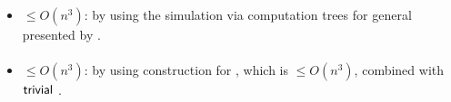 \paragraph{\OMODLA{}\tto\TDFA}\label{cost:OM1DLAto2DFAu}
\begin{itemize}
	\item $\le O(n^3)$: by using the simulation via computation trees for general \OMODLA presented by .
\end{itemize}
\paragraph{\OMODLA{}\tto\TNFA}
\begin{itemize}
	\item $\le O(n^3)$: by using construction for \hyperref[cost:OM1DLAto2DFAu]{\OMODLA{}\tto\TDFA}, which is $\le O(n^3)$, combined with $\mathsf{trivial}$ \TDFA{}\tto\TNFA.
\end{itemize}
